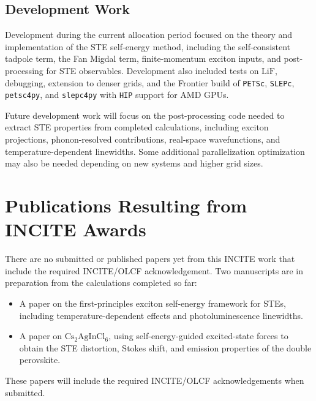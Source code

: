 \documentclass[11pt]{article}
\begin{document}
\subsection{Development Work}
\label{sec:development}

Development during the current allocation period focused on the theory and
implementation of the STE self-energy method, including the self-consistent
tadpole term, the Fan Migdal term, finite-momentum exciton inputs, and
post-processing for STE observables. Development also included tests on
\(\mathrm{LiF}\), debugging, extension to denser grids, and the Frontier build
of \texttt{PETSc}, \texttt{SLEPc}, \texttt{petsc4py}, and
\texttt{slepc4py} with \texttt{HIP} support for AMD GPUs.

Future development work will focus on the post-processing code needed to
extract STE properties from completed calculations, including exciton
projections, phonon-resolved contributions, real-space wavefunctions, and
temperature-dependent linewidths. Some additional parallelization optimization 
may also be
needed depending on new systems and higher grid sizes. 

\section{Publications Resulting from INCITE Awards}

There are no submitted or published papers yet from this INCITE work that
include the required INCITE/OLCF acknowledgement.
Two manuscripts are in preparation from the calculations completed so far:

\begin{itemize}
    \item A paper on the first-principles exciton self-energy framework for
        STEs, including temperature-dependent effects and
        photoluminescence linewidths.
    \item A paper on \(\mathrm{Cs_2AgInCl_6}\), using self-energy-guided
        excited-state forces to obtain the STE distortion, Stokes shift, and
        emission properties of the double perovskite.
\end{itemize}

These papers will include the required INCITE/OLCF acknowledgements
when submitted.

\printbibliography
\end{document}
